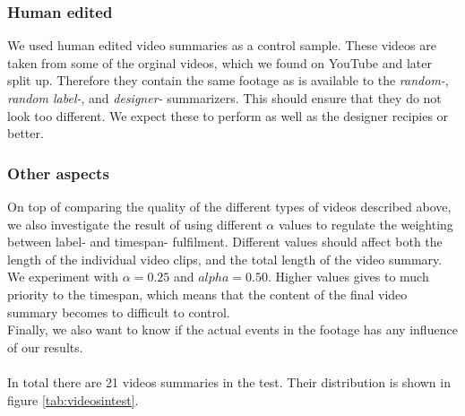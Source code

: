 \subsubsection{Human edited}
%
We used human edited video summaries as a control sample. These videos are taken from some of the orginal videos, which we found on YouTube and later split up. Therefore they contain the same footage as is available to the \textit{random-}, \textit{random label-}, and \textit{designer-} summarizers. This should ensure that they do not look too different. We expect these to perform as well as the designer recipies or better.
%
\subsubsection{Other aspects}\label{sec:otheraspects}
%
On top of comparing the quality of the different types of videos described above, we also investigate the result of using different $\alpha$ values to regulate the weighting between label- and timespan- fulfilment. Different values should affect both the length of the individual video clips, and the total length of the video summary. We experiment with $\alpha=0.25$ and $alpha=0.50$. Higher values gives to much priority to the timespan, which means that the content of the final video summary becomes to difficult to control.\\
Finally, we also want to know if the actual events in the footage has any influence of our results.\\\\
%
In total there are 21 videos summaries in the test. Their distribution is shown in figure \ref{tab:videosintest}.
%

